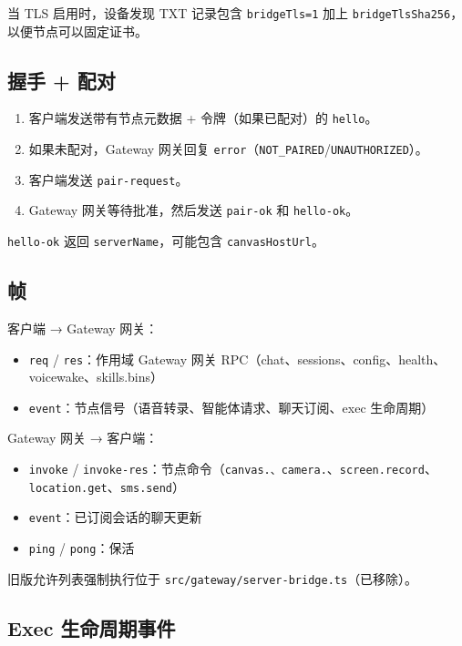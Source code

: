 当 TLS 启用时，设备发现 TXT 记录包含 \texttt{bridgeTls=1} 加上 \texttt{bridgeTlsSha256}，以便节点可以固定证书。

\subsection{握手 + 配对}


\begin{enumerate}
  \item 客户端发送带有节点元数据 + 令牌（如果已配对）的 \texttt{hello}。
  \item 如果未配对，Gateway 网关回复 \texttt{error}（\texttt{NOT\_PAIRED}/\texttt{UNAUTHORIZED}）。
  \item 客户端发送 \texttt{pair-request}。
  \item Gateway 网关等待批准，然后发送 \texttt{pair-ok} 和 \texttt{hello-ok}。
\end{enumerate}


\texttt{hello-ok} 返回 \texttt{serverName}，可能包含 \texttt{canvasHostUrl}。

\subsection{帧}


客户端 → Gateway 网关：

\begin{itemize}
  \item \texttt{req} / \texttt{res}：作用域 Gateway 网关 RPC（chat、sessions、config、health、voicewake、skills.bins）
  \item \texttt{event}：节点信号（语音转录、智能体请求、聊天订阅、exec 生命周期）
\end{itemize}


Gateway 网关 → 客户端：

\begin{itemize}
  \item \texttt{invoke} / \texttt{invoke-res}：节点命令（\texttt{canvas.\textit{}、\texttt{camera.}}、\texttt{screen.record}、\texttt{location.get}、\texttt{sms.send}）
  \item \texttt{event}：已订阅会话的聊天更新
  \item \texttt{ping} / \texttt{pong}：保活
\end{itemize}


旧版允许列表强制执行位于 \texttt{src/gateway/server-bridge.ts}（已移除）。

\subsection{Exec 生命周期事件}


